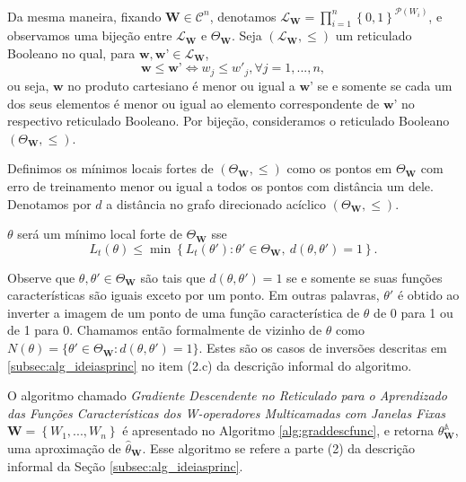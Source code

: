 Da mesma maneira, fixando $\textbf{W} \in \mathscr{C}^{n}$, denotamos $ \mathscr{L}_{\textbf{W}} =  \prod_{i=1}^{n} \left\{ 0,1 \right\}^{\mathcal{P}(W_{i})} $, e observamos uma bijeção entre $\mathscr{L}_{\textbf{W}}$ e $\Theta_{\textbf{W}}$. Seja $ \left( \mathscr{L}_{\textbf{W}} , \leq \right)  $ um reticulado Booleano no qual, para $\textbf{w}, \textbf{w'} \in  \mathscr{L}_{\textbf{W}}$,
$$\textbf{w} \leq \textbf{w'} \iff w_{j}  \leq w'_{j}, \forall j = 1,...,n, $$
ou seja, $\textbf{w}$ no produto cartesiano é menor ou igual a $\textbf{w'}$ se e somente se cada um dos seus elementos é menor ou igual ao elemento correspondente de $\textbf{w'}$ no respectivo reticulado Booleano. Por bijeção, consideramos o reticulado Booleano $\left( \Theta_{\textbf{W}}, \leq \right) $.

Definimos os mínimos locais fortes de $\left( \Theta_{\textbf{W}}, \leq \right) $ como os pontos em $\Theta_{\textbf{W}}$ com erro de treinamento menor ou igual a todos os pontos com distância um dele. Denotamos por $d$ a distância no grafo direcionado acíclico $\left( \Theta_{\textbf{W}}, \leq \right). $

\begin{definition}
    $\theta$ será um mínimo local forte de $\Theta_{\textbf{W}}$ sse
    $$ L_{t} \left( \theta \right) \leq \min \left\{ L_{t} \left( \theta' \right): \theta' \in \Theta_{\textbf{W}}, \ d \left( \theta,\theta' \right) = 1 \right\}. $$
\end{definition}

Observe que $\theta, \theta' \in \Theta_{\textbf{W}} $ são tais que $d \left( \theta,\theta' \right) = 1$ se e somente se suas funções características são iguais exceto por um ponto. Em outras palavras, $\theta'$ é obtido ao inverter a imagem de um ponto de uma função característica de $\theta$ de 0 para 1 ou de 1 para 0. Chamamos então formalmente de vizinho de $\theta$ como $N \left( \theta \right) = \{ \theta' \in  \Theta_{\textbf{W}}: d \left( \theta,\theta' \right) = 1 \}$. Estes são os casos de inversões descritas em \ref{subsec:alg_ideiasprinc} no item (2.c) da descrição informal do algoritmo. 

O algoritmo chamado \textit{Gradiente Descendente no Reticulado para o Aprendizado das Funções Características dos W-operadores Multicamadas com Janelas Fixas $\textbf{W} = \left\{ W_{1},...,W_{n} \right\} $} é apresentado no Algoritmo \ref{alg:graddescfunc}, e retorna $\theta_{\textbf{W}}^{\mathbb{A}}$, uma aproximação de $\hat{\theta}_{\textbf{W}}$. Esse algoritmo se refere a parte (2) da descrição informal da Seção \ref{subsec:alg_ideiasprinc}.

